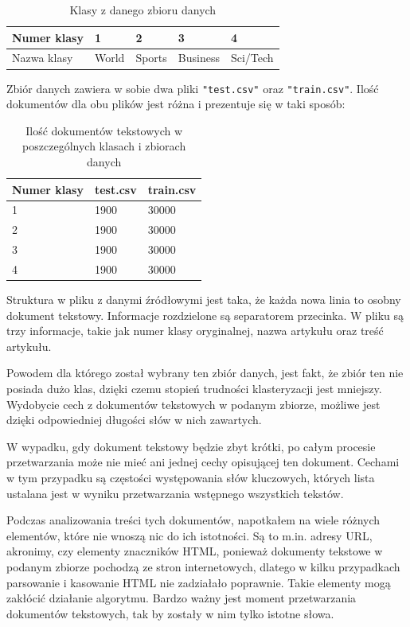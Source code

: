 \begin{table}[h!]
    \centering
    \caption{Klasy z danego zbioru danych}
    \label{datasetclasses}
    \begin{tabular}{|l|l|l|l|l|}
    \hline
    Numer klasy & 1     & 2      & 3        & 4        \\ \hline
    Nazwa klasy & World & Sports & Business & Sci/Tech \\ \hline
    \end{tabular}
\end{table}

Zbiór danych zawiera w sobie dwa pliki \texttt{"test.csv"} oraz \texttt{"train.csv"}. Ilość dokumentów dla obu plików jest różna i prezentuje się w taki sposób:

\begin{table}[h!]
    \centering
    \caption{Ilość dokumentów tekstowych w poszczególnych klasach i zbiorach danych}
    \label{quantityOfDocs}
    \begin{tabular}{|l|l|l|}
    \hline
    Numer klasy & test.csv & train.csv \\ \hline
    1           & 1900     & 30000     \\ \hline
    2           & 1900     & 30000     \\ \hline
    3           & 1900     & 30000     \\ \hline
    4           & 1900     & 30000     \\ \hline
    \end{tabular}
\end{table}
Struktura w pliku z danymi źródłowymi jest taka, że każda nowa linia to osobny dokument tekstowy. Informacje rozdzielone są separatorem przecinka. W pliku są trzy informacje, takie jak numer klasy oryginalnej, nazwa artykułu oraz treść artykułu. 

Powodem dla którego został wybrany ten zbiór danych, jest fakt, że zbiór ten nie posiada dużo klas, dzięki czemu stopień trudności klasteryzacji jest mniejszy. Wydobycie cech z dokumentów tekstowych w podanym zbiorze, możliwe jest dzięki odpowiedniej długości słów w nich zawartych.

W wypadku, gdy dokument tekstowy będzie zbyt krótki, po całym procesie przetwarzania może nie mieć ani jednej cechy opisującej ten dokument. Cechami w tym przypadku są częstości występowania słów kluczowych, których lista ustalana jest w wyniku przetwarzania wstępnego wszystkich tekstów.


Podczas analizowania treści tych dokumentów, napotkałem na wiele różnych elementów, które nie wnoszą nic do ich istotności. Są to m.in. adresy URL, akronimy, czy elementy znaczników HTML, ponieważ dokumenty tekstowe w podanym zbiorze pochodzą ze stron internetowych, dlatego w kilku przypadkach parsowanie i kasowanie HTML nie zadziałało poprawnie. Takie elementy mogą zakłócić działanie algorytmu. Bardzo ważny jest moment przetwarzania dokumentów tekstowych, tak by zostały w nim tylko istotne słowa.
\newpage

